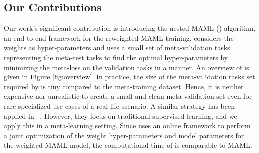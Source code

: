 \vspace{-1ex}
\subsection{Our Contributions}
Our work's significant contribution is introducing the nested MAML (\sysname{}) algorithm, an end-to-end framework for the reweighted MAML training. \sysname{} considers the weights as hyper-parameters and uses a small set of meta-validation tasks representing the meta-test tasks to find the optimal hyper-parameters by minimizing the meta-loss on the validation tasks in a \textbf{\biopt{}} manner.  An overview of \sysname{} is given in Figure \ref{fig:overview}. In practice, the size of the meta-validation tasks set required by \sysname{} is tiny compared to the meta-training dataset. Hence, it is neither expensive nor unrealistic to create a  small and clean meta-validation set even for rare specialized use cases of a real-life scenario. A similar strategy has been applied in ~\citep{ren2018learning,shu2019meta,killamsetty2020glister}. However, they focus on traditional supervised learning, and we apply this in a meta-learning setting. Since \sysname{} uses an online framework to perform a joint optimization of the weight hyper-parameters and model parameters for the weighted MAML model, the computational time of \sysname{} is comparable to MAML.

